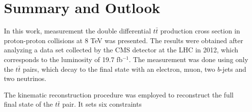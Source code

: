 \chapter{Summary and Outlook}\label{chapt:conc}

In this work, measurement the double differential $t\bar{t}$ production cross section in proton-proton collisions at 8 TeV was presented.
The results were obtained after analyzing a data set collected by the CMS detector at the LHC in 2012, which corresponds to the 
luminosity of 19.7 fb$^{-1}$. The measurement was done using only the $t\bar{t}$ pairs, which decay to the final state with an
electron, muon, two $b$-jets and two neutrinos.

The kinematic reconstruction procedure was employed to reconstruct the full final state of the $t\bar{t}$ pair. It sets six constraints 

